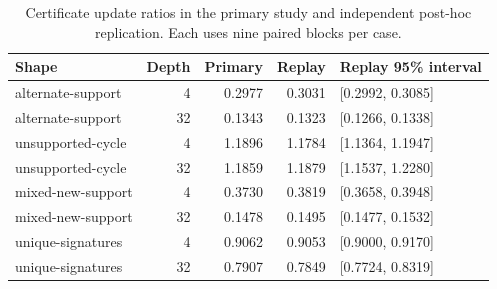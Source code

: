 \begin{table}[ht]
\caption{Certificate update ratios in the primary study and independent post-hoc replication. Each uses nine paired blocks per case.}
\label{tab:support}
\centering\small
\begin{tabular}{@{}lrrrl@{}}
\toprule
Shape & Depth & Primary & Replay & Replay 95\% interval \\
\midrule
alternate-support & 4 & 0.2977 & 0.3031 & [0.2992, 0.3085] \\
alternate-support & 32 & 0.1343 & 0.1323 & [0.1266, 0.1338] \\
unsupported-cycle & 4 & 1.1896 & 1.1784 & [1.1364, 1.1947] \\
unsupported-cycle & 32 & 1.1859 & 1.1879 & [1.1537, 1.2280] \\
mixed-new-support & 4 & 0.3730 & 0.3819 & [0.3658, 0.3948] \\
mixed-new-support & 32 & 0.1478 & 0.1495 & [0.1477, 0.1532] \\
unique-signatures & 4 & 0.9062 & 0.9053 & [0.9000, 0.9170] \\
unique-signatures & 32 & 0.7907 & 0.7849 & [0.7724, 0.8319] \\
\bottomrule
\end{tabular}
\end{table}
